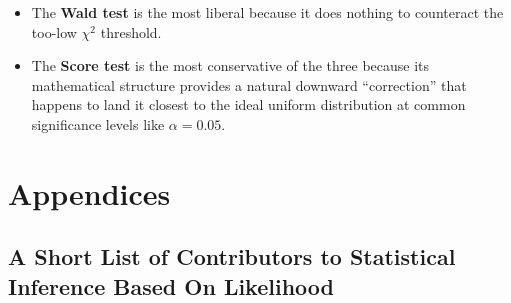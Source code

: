 \documentclass[
  letterpaper,
  DIV=11,
  numbers=noendperiod]{scrreprt}
\providecommand{\tightlist}{%
  \setlength{\itemsep}{0pt}\setlength{\parskip}{0pt}}
\renewcommand{\[}{\begin{equation}}
\renewcommand{\]}{\end{equation}}
\theoremstyle{definition}
\theoremstyle{plain}
\theoremstyle{plain}
\theoremstyle{plain}
\theoremstyle{definition}
\theoremstyle{plain}
\theoremstyle{remark}
\begin{document}
\begin{itemize}
\tightlist
\item
  The \textbf{Wald test} is the most liberal because it does nothing to
  counteract the too-low \(\chi^2\) threshold.
\item
  The \textbf{Score test} is the most conservative of the three because
  its mathematical structure provides a natural downward ``correction''
  that happens to land it closest to the ideal uniform distribution at
  common significance levels like \(\alpha = 0.05\).
\end{itemize}


\chapter{Appendices}\label{appendices}

\section{A Short List of Contributors to Statistical Inference Based On
Likelihood}\label{a-short-list-of-contributors-to-statistical-inference-based-on-likelihood}
\end{document}
